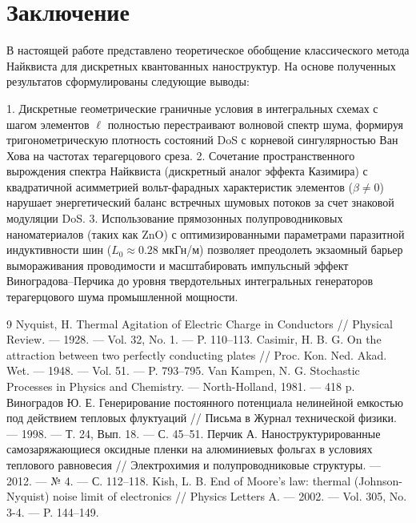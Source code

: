 \documentclass[12pt,a4paper]{article}
\begin{document}
\section{Заключение}
В настоящей работе представлено теоретическое обобщение классического метода Найквиста для дискретных квантованных наноструктур. На основе полученных результатов сформулированы следующие выводы:

   1. Дискретные геометрические граничные условия в интегральных схемах с шагом элементов $\ell$ полностью перестраивают волновой спектр шума, формируя тригонометрическую плотность состояний DoS с корневой сингулярностью Ван Хова на частотах терагерцового среза.
   2. Сочетание пространственного вырождения спектра Найквиста (дискретный аналог эффекта Казимира) с квадратичной асимметрией вольт-фарадных характеристик элементов ($\beta \neq 0$) нарушает энергетический баланс встречных шумовых потоков за счет знаковой модуляции DoS.
   3. Использование прямозонных полупроводниковых наноматериалов (таких как $\text{ZnO}$) с оптимизированными параметрами паразитной индуктивности шин ($L_0 \approx 0.28$ мкГн/м) позволяет преодолеть экзаомный барьер вымораживания проводимости и масштабировать импульсный эффект Виноградова–Перчика до уровня твердотельных интегральных генераторов терагерцового шума промышленной мощности.

\begin{thebibliography}{9}
Nyquist, H. Thermal Agitation of Electric Charge in Conductors // Physical Review. — 1928. — Vol. 32, No. 1. — P. 110–113.
Casimir, H. B. G. On the attraction between two perfectly conducting plates // Proc. Kon. Ned. Akad. Wet. — 1948. — Vol. 51. — P. 793–795.
Van Kampen, N. G. Stochastic Processes in Physics and Chemistry. — North-Holland, 1981. — 418 p.
Виноградов Ю. Е. Генерирование постоянного потенциала нелинейной емкостью под действием тепловых флуктуаций // Письма в Журнал технической физики. — 1998. — Т. 24, Вып. 18. — С. 45–51.
Перчик А. Наноструктурированные самозаряжающиеся оксидные пленки на алюминиевых фольгах в условиях теплового равновесия // Электрохимия и полупроводниковые структуры. — 2012. — № 4. — С. 112–118.
Kish, L. B. End of Moore's law: thermal (Johnson-Nyquist) noise limit of electronics // Physics Letters A. — 2002. — Vol. 305, No. 3-4. — P. 144–149.
\end{thebibliography}
\end{document}
